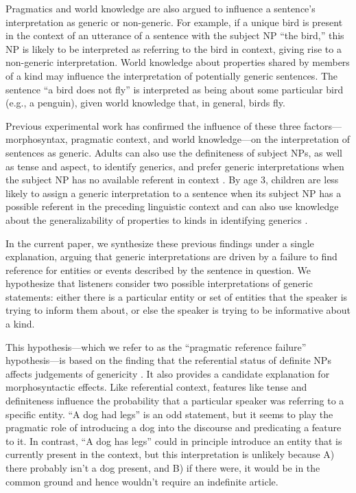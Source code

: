 \documentclass[10pt,letterpaper]{article}
\begin{document}
Pragmatics and world knowledge are also argued to influence a sentence's interpretation as generic or non-generic. For example, if a unique bird is present in the context of an utterance of a sentence with the subject NP ``the bird,'' this NP is likely to be interpreted as referring to the bird in context, giving rise to a non-generic interpretation. World knowledge about properties shared by members of a kind may influence the interpretation of potentially generic sentences. The sentence ``a bird does not fly'' is interpreted as being about some particular bird (e.g., a penguin), given world knowledge that, in general, birds fly.

Previous experimental work has confirmed the influence of these three factors---morphosyntax, pragmatic context, and world knowledge---on the interpretation of sentences as generic. Adults can also use the definiteness of subject NPs, as well as tense and aspect, to identify generics, and prefer generic interpretations when the subject NP has no available referent in context \cite{Gelman:2003,Cimpian:2011}. By age 3, children are less likely to assign a generic interpretation to a sentence when its subject NP has a possible referent in the preceding linguistic context and can also use knowledge about the generalizability of properties to kinds in identifying generics \cite{Cimpian:2008}.


In the current paper, we synthesize these previous findings under a single explanation, arguing that generic interpretations are driven by a failure to find reference for entities or events described by the sentence in question. We hypothesize that listeners consider two possible interpretations of generic statements: either there is a particular entity or set of entities that the speaker is trying to inform them about, or else the speaker is trying to be informative about a kind.

This hypothesis---which we refer to as the ``pragmatic reference failure'' hypothesis---is based on the finding that the referential status of definite NPs affects judgements of genericity \cite{Gelman:2003}. It also provides a candidate explanation for morphosyntactic effects. Like referential context, features like tense and definiteness influence the probability that a particular speaker was referring to a specific entity. ``A dog had legs'' is an odd statement, but it seems to play the pragmatic role of introducing a dog into the discourse and predicating a feature to it. In contrast, ``A dog has legs'' could in principle introduce an entity that is currently present in the context, but this interpretation is unlikely because A) there probably isn't a dog present, and B) if there were, it would be in the common ground and hence wouldn't require an indefinite article.
\end{document}
